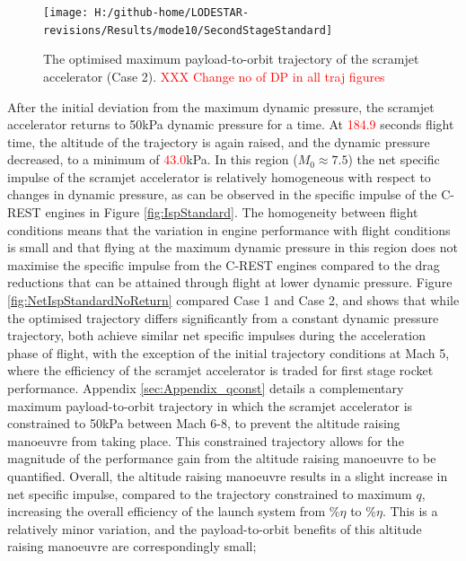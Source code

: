 \begin{figure}[ht!]%
\centering
\texttt{[image: H:/github-home/LODESTAR-revisions/Results/mode10/SecondStageStandard]}
\caption{The optimised maximum payload-to-orbit trajectory of the scramjet accelerator (Case 2). \textcolor{red}{XXX Change no of DP in all traj figures}}
\label{fig:SecondStageStandardNoReturn}
\end{figure}



After the initial deviation from the maximum dynamic pressure, the scramjet accelerator returns to 50kPa dynamic pressure for a time. 
At \textcolor{red}{184.9} seconds flight time, the altitude of the trajectory is again raised, and the dynamic pressure decreased, to a minimum of \textcolor{red}{43.0}kPa. In this region ($M_0 \approx 7.5$) the net specific impulse of the scramjet accelerator is relatively homogeneous with respect to changes in dynamic pressure, as can be observed in the specific impulse of the C-REST engines in Figure \ref{fig:IspStandard}. The homogeneity between flight conditions means that the variation in engine performance with flight conditions is small and that flying at the maximum dynamic pressure in this region does not maximise the specific impulse from the C-REST engines compared to the drag reductions that can be attained through flight at lower dynamic pressure. Figure \ref{fig:NetIspStandardNoReturn} compared Case 1 and Case 2, and shows that while the optimised trajectory differs significantly from a constant dynamic pressure trajectory, both achieve similar net specific impulses during the acceleration phase of flight, with the exception of the initial trajectory conditions at Mach 5, where the efficiency of the scramjet accelerator is traded for first stage rocket performance. 
Appendix \ref{sec:Appendix_qconst} details a complementary maximum payload-to-orbit trajectory in which the scramjet accelerator is constrained to 50kPa between Mach 6-8, to prevent the altitude raising manoeuvre from taking place. This constrained trajectory allows for the magnitude of the performance gain from the altitude raising manoeuvre to be quantified. 
Overall, the altitude raising manoeuvre results in a slight increase in net specific impulse, compared to the trajectory constrained to maximum $q$, increasing the overall efficiency of the launch system from \totalExergyEffqconstrainedNoReturn \%$\eta$ to \totalExergyEffStandardNoReturn\%$\eta$. This is a relatively minor variation, and the payload-to-orbit benefits of this altitude raising manoeuvre are correspondingly small; 
